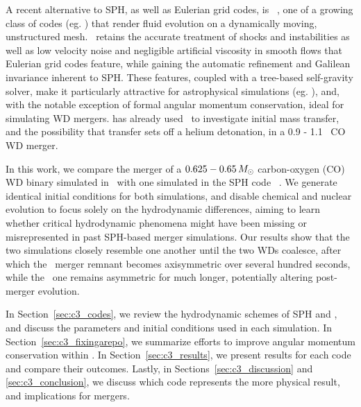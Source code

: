 
A recent alternative to SPH, as well as Eulerian grid codes, is \arepo\ \citep{spri10}, one of a growing class of codes (eg. \citealt{duffm11, gabujl12, vandr16}) that render fluid evolution on a dynamically moving, unstructured mesh.  \arepo\ retains the accurate treatment of shocks and instabilities as well as low velocity noise and negligible artificial viscosity in smooth flows that Eulerian grid codes feature, while gaining the automatic refinement and Galilean invariance inherent to SPH.  These features, coupled with a tree-based self-gravity solver, make it particularly attractive for astrophysical simulations (eg. \citealt{voge+12, pakms13, hayw+14, marips14, ohlm+16}), and, with the notable exception of formal angular momentum conservation, ideal for simulating WD mergers.  \cite{pakm+13} has already used \arepo\ to investigate initial mass transfer, and the possibility that transfer sets off a helium detonation, in a 0.9 - 1.1 \Msun\ CO WD merger.

In this work, we compare the merger of a $0.625 - 0.65\,\Msun$ carbon-oxygen (CO) WD binary simulated in \arepo\ with one simulated in the SPH code \gasoline\ \citep{wadssq04}.  We generate identical initial conditions for both simulations, and disable chemical and nuclear evolution to focus solely on the hydrodynamic differences, aiming to learn whether critical hydrodynamic phenomena might have been missing or misrepresented in past SPH-based merger simulations.  Our results show that the two simulations closely resemble one another until the two WDs coalesce, after which the \gasoline\ merger remnant becomes axisymmetric over several hundred seconds, while the \arepo\ one remains asymmetric for much longer, potentially altering post-merger evolution.


In Section~\ref{sec:c3_codes}, we review the hydrodynamic schemes of SPH and \arepo, and discuss the parameters and initial conditions used in each simulation.  In Section~\ref{sec:c3_fixingarepo}, we summarize efforts to improve angular momentum conservation within \arepo.  In Section~\ref{sec:c3_results}, we present results for each code and compare their outcomes.  Lastly, in Sections~\ref{sec:c3_discussion} and \ref{sec:c3_conclusion}, we discuss which code represents the more physical result, and implications for mergers.
